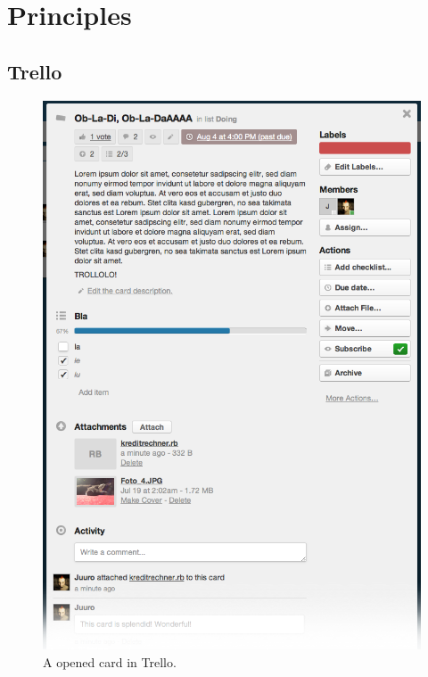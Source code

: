 
\chapter{Principles}
  \label{Principles}

\section{Trello}



\begin{figure}[htb]
\centering
\includegraphics[width=\textwidth]{figures/trello-card}
\caption{A opened card in Trello.}
\label{fig:trello-card}
\end{figure}


